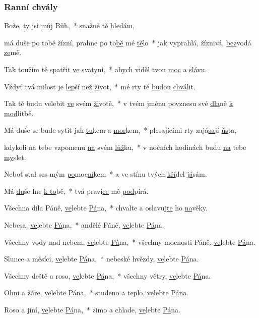 \subsubsection{Ranní chvály}


Bože, \underline{ty} jsi \underline{můj} Bůh,~*
\underline{snaž}ně tě \underline{hle}dám,

má duše po tobě žízní, prahne po to\underline{bě} mé \underline{tě}lo~*
jak vyprahlá, žíznivá, \underline{bez}vodá \underline{ze}mě.

Tak toužím tě spatřit \underline{ve} sva\underline{ty}ni,~*
abych viděl tvou \underline{moc} a \underline{slá}vu.

Vždyť tvá milost je \underline{lep}ší než \underline{ži}vot,~*
mé rty tě \underline{bu}dou \underline{chvá}lit.

Tak tě budu velebit \underline{ve} svém \underline{ži}votě,~*
v tvém jménu povznesu své \underline{dla}ně \underline{k mod}litbě.

Má duše se bude sytit jak \underline{tu}kem a \underline{mor}kem,~*
plesajícími rty zajá\underline{sa}jí \underline{ús}ta,

kdykoli na tebe vzpomenu \underline{na} svém \underline{lůž}ku,~*
v nočních hodinách budu \underline{na} tebe \underline{my}slet.

Neboť stal ses mým \underline{po}moc\underline{ní}kem~*
a ve stínu tvých \underline{kří}del \underline{já}sám.

Má \underline{du}še lne \underline{k to}bě,~*
tvá pravi\underline{ce} mě \underline{pod}pírá.


\newcommand{\velebteA}{\underline{ve}lebte \underline{Pá}na,~* }
\newcommand{\velebteB}{\underline{ve}lebte \underline{Pá}na. }

Všechna díla Páně, \velebteA
chvalte a oslavuj\underline{te} ho \underline{na}věky.

Nebesa, \velebteA
andělé Páně, \velebteB

Všechny vody nad nebem, \velebteA
všechny mocnosti Páně, \velebteB

Slunce a měsíci, \velebteA
nebeské hvězdy, \velebteB

Všechny deště a roso, \velebteA
všechny větry, \velebteB

Ohni a žáre, \velebteA
studeno a teplo, \velebteB

Roso a jíní, \velebteA
zimo a chlade, \velebteB

